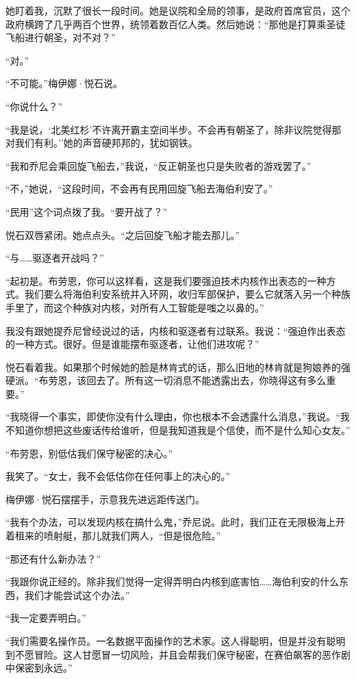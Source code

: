 \documentclass[AutoFakeBold=true]{book}
\begin{document}
她盯着我，沉默了很长一段时间。她是议院和全局的领事，是政府首席官员，这个政府横跨了几乎两百个世界，统领着数百亿人类。然后她说：``那他是打算乘圣徒飞船进行朝圣，对不对？''

``对。''

``不可能。''梅伊娜·悦石说。

``你说什么？''

``我是说，`北美红杉'不许离开霸主空间半步。不会再有朝圣了，除非议院觉得那对我们有利。''她的声音硬邦邦的，犹如钢铁。

``我和乔尼会乘回旋飞船去，''我说，``反正朝圣也只是失败者的游戏罢了。''

``不，''她说，``这段时间，不会再有民用回旋飞船去海伯利安了。''

``民用''这个词点拨了我。``要开战了？''

悦石双唇紧闭。她点点头。``之后回旋飞船才能去那儿。''

``与……驱逐者开战吗？''

``起初是。布劳恩，你可以这样看，这是我们要强迫技术内核作出表态的一种方式。我们要么将海伯利安系统并入环网，收归军部保护，要么它就落入另一个种族手里了，而这个种族对内核，对所有人工智能是嗤之以鼻的。''

我没有跟她提乔尼曾经说过的话，内核和驱逐者有过联系。我说：``强迫作出表态的一种方式。很好。但是谁能摆布驱逐者，让他们进攻呢？''

悦石看着我。如果那个时候她的脸是林肯式的话，那么旧地的林肯就是狗娘养的强硬派。``布劳恩，该回去了。所有这一切消息不能透露出去，你晓得这有多么重要。''

``我晓得一个事实，即使你没有什么理由，你也根本不会透露什么消息，''我说。``我不知道你想把这些废话传给谁听，但是我知道我是个信使，而不是什么知心女友。''

``布劳恩，别低估我们保守秘密的决心。''

我笑了。``女士，我不会低估你在任何事上的决心的。''

梅伊娜·悦石摆摆手，示意我先进远距传送门。

\vspace*{1em}

``我有个办法，可以发现内核在搞什么鬼，''乔尼说。此时，我们正在无限极海上开着租来的喷射艇，那儿就我们两人，``但是很危险。''

``那还有什么新办法？''

``我跟你说正经的。除非我们觉得一定得弄明白内核到底害怕……海伯利安的什么东西，我们才能尝试这个办法。''

``我一定要弄明白。''

``我们需要名操作员。一名数据平面操作的艺术家。这人得聪明，但是并没有聪明到不愿冒险。这人甘愿冒一切风险，并且会帮我们保守秘密，在赛伯飙客的恶作剧中保密到永远。''
\end{document}
